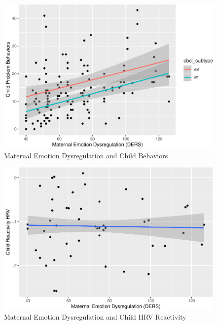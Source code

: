 \documentclass[man]{apa6}
\begin{document}
\begin{figure}
\centering
\includegraphics{DataPrepScript_apa_style_files/figure-latex/plot1-1.pdf}
\caption{\label{fig:plot1}Maternal Emotion Dysregulation and Child
Behaviors}
\end{figure}

\begin{figure}
\centering
\includegraphics{DataPrepScript_apa_style_files/figure-latex/plot2-1.pdf}
\caption{\label{fig:plot2}Maternal Emotion Dysregulation and Child HRV
Reactivity}
\end{figure}
\end{document}
